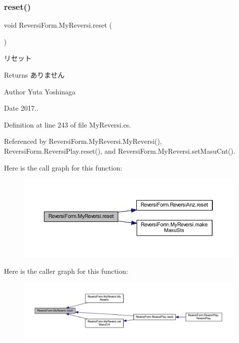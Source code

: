 \subsubsection{\texorpdfstring{reset()}{reset()}}
{\footnotesize\ttfamily void Reversi\+Form.\+My\+Reversi.\+reset (\begin{DoxyParamCaption}{ }\end{DoxyParamCaption})}



リセット 

\begin{DoxyReturn}{Returns}
ありません 
\end{DoxyReturn}
\begin{DoxyAuthor}{Author}
Yuta Yoshinaga 
\end{DoxyAuthor}
\begin{DoxyDate}{Date}
2017.. 
\end{DoxyDate}


Definition at line 243 of file My\+Reversi.\+cs.



Referenced by Reversi\+Form.\+My\+Reversi.\+My\+Reversi(), Reversi\+Form.\+Reversi\+Play.\+reset(), and Reversi\+Form.\+My\+Reversi.\+set\+Masu\+Cnt().

Here is the call graph for this function\+:
\nopagebreak
\begin{figure}[H]
\begin{center}
\leavevmode
\includegraphics[width=350pt]{class_reversi_form_1_1_my_reversi_aa8d8e839466c63462954080353cd4a9e_cgraph}
\end{center}
\end{figure}
Here is the caller graph for this function\+:
\nopagebreak
\begin{figure}[H]
\begin{center}
\leavevmode
\includegraphics[width=350pt]{class_reversi_form_1_1_my_reversi_aa8d8e839466c63462954080353cd4a9e_icgraph}
\end{center}
\end{figure}
\mbox{\label{class_reversi_form_1_1_my_reversi_a990acf71124e50643c0774c38f8f634b}} 
